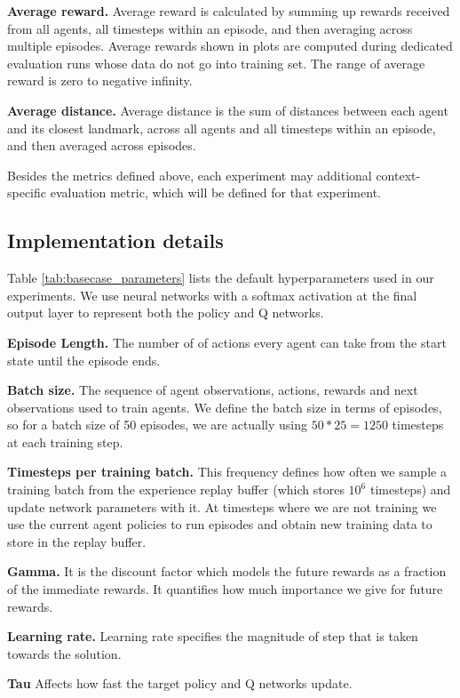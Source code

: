 \documentclass{article}
\begin{document}
\textbf{Average reward.} Average reward is calculated by summing up rewards received from all agents, all timesteps within an episode, and then averaging across multiple episodes. Average rewards shown in plots are computed during dedicated evaluation runs whose data do not go into training set. The range of average reward is zero to negative infinity. 

\textbf{Average distance.} Average distance is the sum of distances between each agent and its closest landmark, across all agents and all timesteps within an episode, and then averaged across episodes.

Besides the metrics defined above, each experiment may additional context-specific evaluation metric, which will be defined for that experiment.


\subsection{Implementation details}

Table \ref{tab:basecase_parameters} lists the default hyperparameters used in our experiments. We use neural networks with a softmax activation at the final output layer to represent both the policy and Q networks.

\textbf{Episode Length.} The number of of actions every agent can take from the start state until the episode ends.

\textbf{Batch size.} The sequence of agent observations, actions, rewards and next observations used to train agents. We define the batch size in terms of episodes, so for a batch size of 50 episodes, we are actually using $50*25 = 1250$ timesteps at each training step.

\textbf{Timesteps per training batch.} This frequency defines how often we sample a training batch from the experience replay buffer (which stores $10^6$ timesteps) and update network parameters with it. At timesteps where we are not training we use the current agent policies to run episodes and obtain new training data to store in the replay buffer.

\textbf{Gamma.} It is the discount factor which models the future rewards as a fraction of the immediate rewards. It quantifies how much importance we give for future rewards.

\textbf{Learning rate.} Learning rate specifies the magnitude of step that is taken towards the solution. 

\textbf{Tau} Affects how fast the target policy and Q networks update. 
\end{document}
